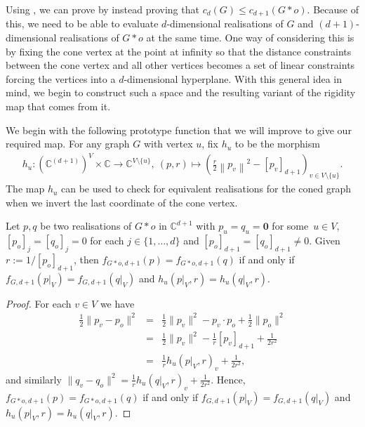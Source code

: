 \documentclass[ALCO]{cedram}
\begin{document}
Using ,
we can prove  by instead proving that $c_d(G) \leq c_{d+1}(G*o)$.
Because of this, we need to be able to evaluate $d$-dimensional realisations of $G$ and $(d+1)$-dimensional realisations of $G*o$ at the same time.
One way of considering this is by fixing the cone vertex at the point at infinity so that the distance constraints between the cone vertex and all other vertices becomes a set of linear constraints forcing the vertices into a $d$-dimensional hyperplane.
With this general idea in mind,
we begin to construct such a space and the resulting variant of the rigidity map that comes from it.

We begin with the following prototype function that we will improve to give our required map.
For any graph $G$ with vertex $u$,
fix $h_u$ to be the morphism
\begin{align*}
	h_u : (\mathbb{C}^{(d+1)})^V \times \mathbb{C} \rightarrow \mathbb{C}^{V \setminus \{u\}}, ~ (p,r) \mapsto \left( \frac{r}{2}\left\|p_v \right\|^2 -  [p_v]_{d+1} \right)_{v \in V \setminus \{u\}}.
\end{align*}
The map $h_u$ can be used to check for equivalent realisations for the coned graph when we invert the last coordinate of the cone vertex.

\begin{lemma}\label{l:equivmap}
	Let $p,q$ be two realisations of $G*o$ in $\mathbb{C}^{d+1}$ with $p_{u}= q_{u}=\mathbf{0}$ for some~$u \in V$,
	$[p_o]_j=[q_o]_j=0$ for each $j \in \{1,\ldots,d\}$ and $[p_o]_{d+1} = [q_o]_{d+1} \neq 0$.
	Given $r := 1/[p_o]_{d+1}$,
	then $f_{G*o,d+1}(p)= f_{G*o,d+1}(q)$ if and only if $f_{G,d+1}(p|_V) = f_{G,d+1}(q|_V)$ and $h_u(p|_V,r)=h_u(q|_V,r)$.
\end{lemma}

\begin{proof}
	For each $v \in V$ we have
	\begin{eqnarray*}
		\frac{1}{2}\|p_v-p_o\|^2 &=& \frac{1}{2}\|p_v\|^2 - p_v \cdot p_o + \frac{1}{2}\| p_o\|^2\\
		&=& \frac{1}{2}\|p_v\|^2 - \frac{1}{r} [p_v]_{d+1} + \frac{1}{2 r^2} \\
		&=& \frac{1}{r} h_u(p|_V, r)_v  +  \frac{1}{2 r^2},
	\end{eqnarray*}
	and similarly $\|q_v-q_o\|^2 = \frac{1}{r} h_{u}(q|_V, r)_v  +  \frac{1}{2r^2}$.
	Hence, $f_{G*o,d+1}(p)= f_{G*o,d+1}(q)$ if and only if $f_{G,d+1}(p|_V) = f_{G,d+1}(q|_V)$ and $h_u(p|_V,r)=h_u(q|_V,r)$.
\end{proof}
\end{document}
